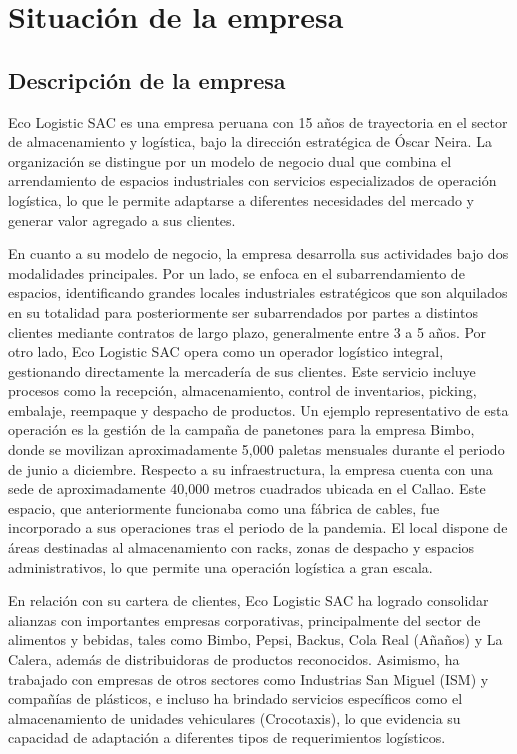 \documentclass[11pt]{article}
\begin{document}
\newpage
{}
\thispagestyle{plain}
\tableofcontents
\newpage

\setcounter{page}{1}

\section{Situación de la empresa}

\subsection{Descripción de la empresa}

Eco Logistic SAC es una empresa peruana con 15 años de trayectoria en el
sector de almacenamiento y logística, bajo la dirección estratégica de
Óscar Neira. La organización se distingue por un modelo de negocio dual
que combina el arrendamiento de espacios industriales con servicios
especializados de operación logística, lo que le permite adaptarse a
diferentes necesidades del mercado y generar valor agregado a sus
clientes.

En cuanto a su modelo de negocio, la empresa desarrolla sus actividades
bajo dos modalidades principales. Por un lado, se enfoca en el
subarrendamiento de espacios, identificando grandes locales industriales
estratégicos que son alquilados en su totalidad para posteriormente ser
subarrendados por partes a distintos clientes mediante contratos de
largo plazo, generalmente entre 3 a 5 años. Por otro lado, Eco Logistic
SAC opera como un operador logístico integral, gestionando directamente
la mercadería de sus clientes. Este servicio incluye procesos como la
recepción, almacenamiento, control de inventarios, picking, embalaje,
reempaque y despacho de productos. Un ejemplo representativo de esta
operación es la gestión de la campaña de panetones para la empresa
Bimbo, donde se movilizan aproximadamente 5,000 paletas mensuales
durante el periodo de junio a diciembre. Respecto a su infraestructura,
la empresa cuenta con una sede de aproximadamente 40,000 metros
cuadrados ubicada en el Callao. Este espacio, que anteriormente
funcionaba como una fábrica de cables, fue incorporado a sus operaciones
tras el periodo de la pandemia. El local dispone de áreas destinadas al
almacenamiento con racks, zonas de despacho y espacios administrativos,
lo que permite una operación logística a gran escala.

En relación con su cartera de clientes, Eco Logistic SAC ha logrado
consolidar alianzas con importantes empresas corporativas,
principalmente del sector de alimentos y bebidas, tales como Bimbo,
Pepsi, Backus, Cola Real (Añaños) y La Calera, además de distribuidoras
de productos reconocidos. Asimismo, ha trabajado con empresas de otros
sectores como Industrias San Miguel (ISM) y compañías de plásticos, e
incluso ha brindado servicios específicos como el almacenamiento de
unidades vehiculares (Crocotaxis), lo que evidencia su capacidad de
adaptación a diferentes tipos de requerimientos logísticos.
\end{document}
